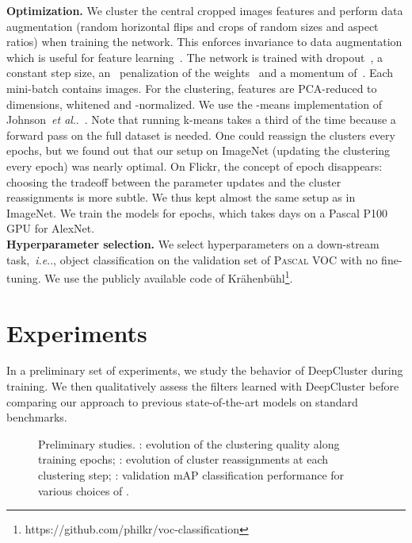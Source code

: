 \documentclass[runningheads]{llncs}
\makeatletter
\DeclareRobustCommand\onedot{\futurelet\@let@token\@onedot}
\def\@onedot{\ifx\@let@token.\else.\null\fi\xspace}
\def\ie{\emph{i.e}\onedot} \def\Ie{\emph{I.e}\onedot}
\def\etal{\emph{et al}\onedot}
\def\OURS{DeepCluster\xspace}
\makeatother
\begin{document}
\noindent\textbf{Optimization.}
We cluster the central cropped images features and perform data augmentation (random horizontal flips and crops of random sizes and aspect ratios) when training the network. 
This enforces invariance to data augmentation which is useful for feature learning~\cite{dosovitskiy2014discriminative}.
The network is trained with dropout~\cite{srivastava2014dropout}, a constant step size, an~
penalization of the weights~ and a momentum of~.
Each mini-batch contains  images.
For the clustering, features are PCA-reduced to  dimensions, whitened and -normalized.
We use the -means implementation of Johnson~\etal~\cite{johnson2017billion}.
Note that running k-means takes a third of the time because a forward pass on the full dataset is needed.
One could reassign the clusters every  epochs, but we found out that our setup on ImageNet (updating the clustering every epoch) was nearly optimal.
On Flickr, the concept of epoch disappears: choosing the tradeoff between the parameter updates and the cluster reassignments is more subtle.
We thus kept almost the same setup as in ImageNet.
We train the models for  epochs, which takes  days on a Pascal P100 GPU for AlexNet.
\\

\noindent\textbf{Hyperparameter selection.}
We select hyperparameters on a down-stream task,~\ie, object classification on
the validation set of \textsc{Pascal} VOC with no fine-tuning.
We use the publicly available code of Kr\"ahenb\"uhl\footnote{https://github.com/philkr/voc-classification}.

 
\section{Experiments}



In a preliminary set of experiments, we study the behavior of \OURS during training.
We then qualitatively assess the filters learned with \OURS before comparing our approach to previous state-of-the-art models on standard benchmarks.

\begin{figure}[t]
	\centering
	\caption{
		Preliminary studies.
		\protect{}: evolution of the clustering quality along training epochs;
		\protect{}: evolution of cluster reassignments at each clustering step;
		\protect{}: validation mAP classification performance for various choices of .
	}
	\label{fig:prelim}
\end{figure}
\end{document}
